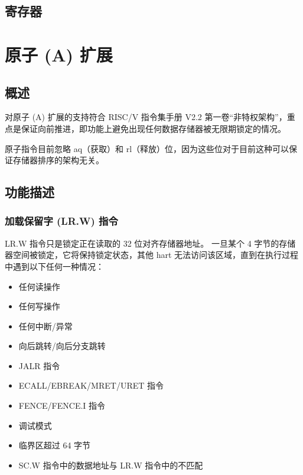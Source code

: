 \documentclass[main\_\_CN.tex]{subfiles}
\begin{document}
\subsection{寄存器}
\label{sec:riscvcpu-fastio-reg-desc}



\clearpage
\section{原子 (A) 扩展}
\label{sec:riscvcpu-atomic}

\subsection{概述}
\label{sec:riscvcpu-atomic-overview}

对原子 (A) 扩展的支持符合 RISC\-/V 指令集手册 V2.2 第一卷“非特权架构”，重点是保证向前推进，即功能上避免出现任何数据存储器被无限期锁定的情况。

原子指令目前忽略 aq（获取）和 rl（释放）位，因为这些位对于目前这种可以保证存储器排序的架构无关。

\subsection{功能描述}
\label{sec:riscvcpu-atomic-func-descr}

\subsubsection{加载保留字 (LR.W) 指令}
\label{sec:riscvcpu-atomic-lr}

LR.W 指令只是锁定正在读取的 32 位对齐存储器地址。 一旦某个 4 字节的存储器空间被锁定，它将保持锁定状态，其他 hart 无法访问该区域，直到在执行过程中遇到以下任何一种情况：

\begin{itemize}
     \item 任何读操作
     \item 任何写操作
     \item 任何中断/异常
     \item 向后跳转/向后分支跳转
     \item JALR 指令
     \item ECALL/EBREAK/MRET/URET 指令
     \item FENCE/FENCE.I 指令
     \item 调试模式
     \item 临界区超过 64 字节
     \item SC.W 指令中的数据地址与 LR.W 指令中的不匹配
\end{itemize}
\end{document}
